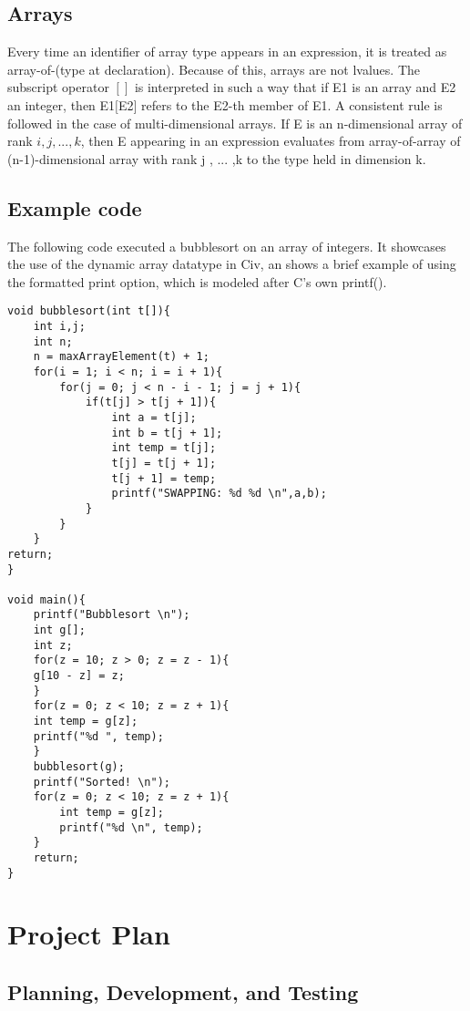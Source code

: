 \documentclass[a4paper]{article}
\begin{document}
\subsection{Arrays}
Every time an identifier of array type appears in an expression, it is treated as array-of-(type at declaration). Because of this, arrays are not lvalues. The subscript operator $[ ]$ is interpreted in such a way that if E1 is an array and E2 an integer, then E1$[$E2$]$ refers to the E2-th member of E1. A consistent rule is followed in the case of multi-dimensional arrays. If E is an n-dimensional array of rank $i , j , ... ,k$, then E appearing in an expression evaluates from array-of-array of (n-1)-dimensional array with rank j , ... ,k to the type held in dimension k. 

\subsection{Example code}
The following code executed a bubblesort on an array of integers. It showcases the use of the dynamic array datatype in Civ, an shows a brief example of using the formatted print option, which is modeled after C's own printf().
\begin{verbatim}
void bubblesort(int t[]){
    int i,j;
    int n;
    n = maxArrayElement(t) + 1;
    for(i = 1; i < n; i = i + 1){
        for(j = 0; j < n - i - 1; j = j + 1){
            if(t[j] > t[j + 1]){
                int a = t[j];
                int b = t[j + 1];
                int temp = t[j];
                t[j] = t[j + 1];
                t[j + 1] = temp;
                printf("SWAPPING: %d %d \n",a,b);
            }   
        }    
    }
return;
}

void main(){
    printf("Bubblesort \n");
    int g[];
    int z;
    for(z = 10; z > 0; z = z - 1){
    g[10 - z] = z;
    }
    for(z = 0; z < 10; z = z + 1){ 
    int temp = g[z];
    printf("%d ", temp);
    }
    bubblesort(g);
    printf("Sorted! \n");
    for(z = 0; z < 10; z = z + 1){
        int temp = g[z];
        printf("%d \n", temp);
    }
    return;
}
\end{verbatim}








\section{Project Plan}
\subsection{Planning, Development, and Testing}
\end{document}
